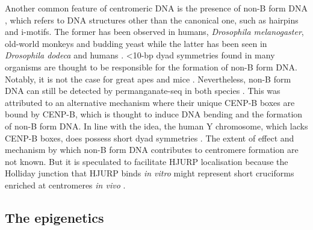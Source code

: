 Another common feature of centromeric DNA is the presence of non-B form DNA \citep{Kasinathan2018Non-B-FormCentromeres}, which refers to DNA structures other than the canonical one, such as hairpins and i-motifs. The former has been observed in humans, \textit{Drosophila melanogaster}, old-world monkeys and budding yeast while the latter has been seen in \textit{Drosophila dodeca} and humans \citep{Koch2000NeocentromeresDNA, Ferrer1995CentromericStructures, Catasti1994UnusualCentromeres}. <10-bp dyad symmetries found in many organisms are thought to be responsible for the formation of non-B form DNA. Notably, it is not the case for great apes and mice \citep{Kasinathan2018Non-B-FormCentromeres}. Nevertheless, non-B form DNA can still be detected by permanganate-seq in both species \citep{Kouzine2017Permanganate/S1Genome, Kouzine2013GlobalLymphocytes}. This was attributed to an alternative mechanism where their unique CENP-B boxes are bound by CENP-B, which is thought to induce DNA bending and the formation of non-B form DNA. In line with the idea, the human Y chromosome, which lacks CENP-B boxes, does possess short dyad symmetries \citep{Kasinathan2018Non-B-FormCentromeres}. The extent of effect and mechanism by which non-B form DNA contributes to centromere formation are not known. But it is speculated to facilitate HJURP localisation because the Holliday junction that HJURP binds \textit{in vitro} \citep{Kato2007ActivationCells} might represent short cruciforms enriched at centromeres \textit{in vivo} \citep{Kasinathan2018Non-B-FormCentromeres}. 


\subsection{The epigenetics}

